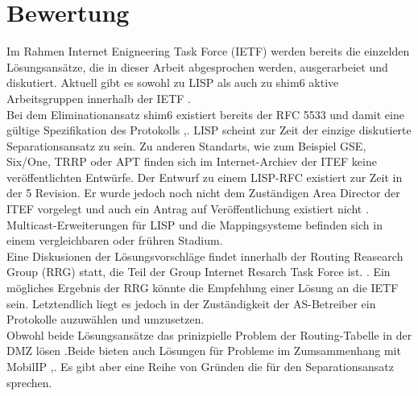 \section{Bewertung}
Im Rahmen Internet Enigneering Task Force (IETF) werden bereits die einzelden Lösungsansätze, die in dieser Arbeit abgesprochen werden, ausgerarbeiet und diskutiert. Aktuell gibt es sowohl zu LISP als auch zu shim6 aktive Arbeitsgruppen innerhalb der IETF \cite{ietf:groups}. \\

Bei dem Eliminationansatz shim6 existiert bereits der RFC 5533 und damit eine gültige Spezifikation des Protokolls \cite{nordmark:2009:RFC5533},\cite{ietf:documents}. LISP scheint zur Zeit der einzige diskutierte Separationsansatz zu sein. Zu anderen Standarts, wie zum Beispiel GSE, Six/One, TRRP oder APT finden sich im Internet-Archiev der ITEF keine veröffentlichten Entwürfe. Der Entwurf zu einem LISP-RFC \cite{farinacci:2009:LISP} existiert zur Zeit in der 5 Revision. Er wurde jedoch noch nicht dem Zuständigen Area Director der ITEF vorgelegt und auch ein Antrag auf Veröffentlichung existiert nicht \cite{ietf:documents}.  Multicast-Erweiterungen für LISP und die Mappingsysteme befinden sich in einem vergleichbaren oder frühren Stadium. \\

Eine Diskusionen der Lösungsvorschläge findet innerhalb der Routing Reasearch Group (RRG) statt, die Teil der Group Internet Resarch Task Force ist. \cite{irtf:rrg}. Ein mögliches Ergebnis der RRG könnte die Empfehlung einer Lösung an die IETF sein. Letztendlich liegt es jedoch in der Zuständigkeit der AS-Betreiber ein Protokolle auzuwählen und umzusetzen. \\

Obwohl beide Lösungsansätze das prinizpielle Problem der Routing-Tabelle in der DMZ lösen \cite{jen:2008:start}.Beide bieten auch Lösungen für Probleme im Zumsammenhang mit MobilIP \cite{farinacci:2009:LISP},\cite{nordmark:2009:RFC5533}. Es gibt aber eine Reihe von Gründen die für den Separationsansatz sprechen. \\ 

